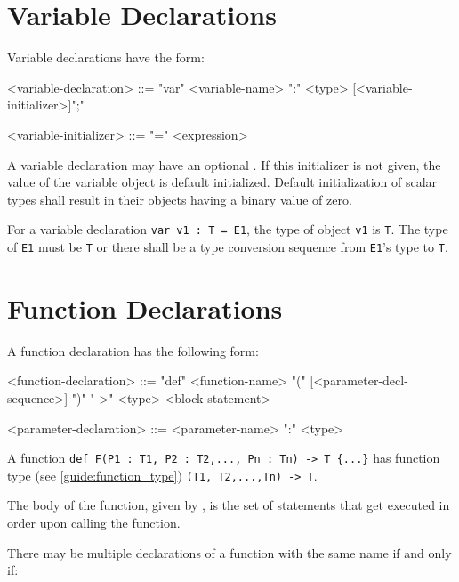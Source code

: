 \section{Variable Declarations} \label{guide:variables}

Variable declarations have the form:

\begin{minip}
\begin{grammar}
<variable-declaration> ::=
"var" <variable-name> ":" <type> [<variable-initializer>]";"

<variable-initializer> ::= "=" <expression>
\end{grammar}
\end{minip}

A variable declaration may have an optional . If this initializer is not given, the value of the variable object is default initialized. Default initialization of scalar types shall result in their objects having a binary value of zero.

For a variable declaration \texttt{var v1 : T = E1}, the type of object \texttt{v1} is \texttt{T}. The type of \texttt{E1} must be \texttt{T} or there shall be a type conversion sequence from \texttt{E1}'s type to \texttt{T}. 

\section{Function Declarations} \label{guide:function}

A function declaration has the following form:

\begin{minip}
\begin{grammar}
<function-declaration> ::=
"def" <function-name> "(" [<parameter-decl-sequence>] ")" "->" <type> <block-statement>

<parameter-declaration> ::= <parameter-name> ":" <type>
\end{grammar}
\end{minip}

A function \texttt{def F(P1 : T1, P2 : T2,..., Pn : Tn) -> T \{...\}} has function type (see \ref{guide:function_type}) \texttt{(T1, T2,...,Tn) -> T}.

The body of the function, given by , is the set of statements that get executed in order upon calling the function.

There may be multiple declarations of a function with the same name if and only if:

